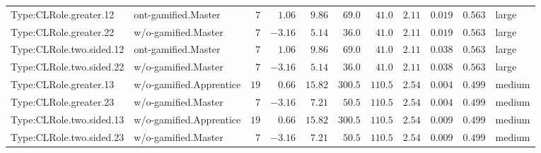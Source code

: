 \documentclass[6pt,a4paper]{article}
\begin{document}
{\begin{longtable}{llrrrrrrrrl}
Type:CLRole.greater.12&ont-gamified.Master&$ 7$&$ 1.06$&$ 9.86$&$ 69.0$&$ 41.0$&$2.11$&$0.019$&$0.563$&large\tabularnewline
Type:CLRole.greater.22&w/o-gamified.Master&$ 7$&$-3.16$&$ 5.14$&$ 36.0$&$ 41.0$&$2.11$&$0.019$&$0.563$&large\tabularnewline
Type:CLRole.two.sided.12&ont-gamified.Master&$ 7$&$ 1.06$&$ 9.86$&$ 69.0$&$ 41.0$&$2.11$&$0.038$&$0.563$&large\tabularnewline
Type:CLRole.two.sided.22&w/o-gamified.Master&$ 7$&$-3.16$&$ 5.14$&$ 36.0$&$ 41.0$&$2.11$&$0.038$&$0.563$&large\tabularnewline
Type:CLRole.greater.13&w/o-gamified.Apprentice&$19$&$ 0.66$&$15.82$&$300.5$&$110.5$&$2.54$&$0.004$&$0.499$&medium\tabularnewline
Type:CLRole.greater.23&w/o-gamified.Master&$ 7$&$-3.16$&$ 7.21$&$ 50.5$&$110.5$&$2.54$&$0.004$&$0.499$&medium\tabularnewline
Type:CLRole.two.sided.13&w/o-gamified.Apprentice&$19$&$ 0.66$&$15.82$&$300.5$&$110.5$&$2.54$&$0.009$&$0.499$&medium\tabularnewline
Type:CLRole.two.sided.23&w/o-gamified.Master&$ 7$&$-3.16$&$ 7.21$&$ 50.5$&$110.5$&$2.54$&$0.009$&$0.499$&medium\tabularnewline
\hline
\end{longtable}}
\end{document}
